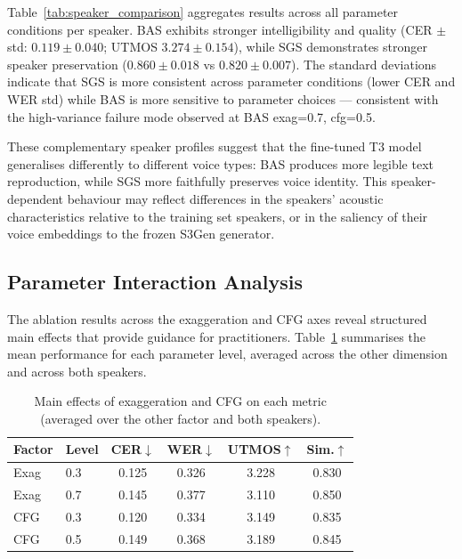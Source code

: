 \documentclass[conference]{IEEEtran}
\begin{document}
Table~\ref{tab:speaker_comparison} aggregates results across all
parameter conditions per speaker.
BAS exhibits stronger intelligibility and quality (CER $\pm$ std:
$0.119 \pm 0.040$; UTMOS $3.274 \pm 0.154$), while SGS demonstrates
stronger speaker preservation ($0.860 \pm 0.018$ vs $0.820 \pm 0.007$).
The standard deviations indicate that SGS is more consistent across
parameter conditions (lower CER and WER std) while BAS is more
sensitive to parameter choices — consistent with the high-variance
failure mode observed at BAS exag=0.7, cfg=0.5.

These complementary speaker profiles suggest that the fine-tuned T3
model generalises differently to different voice types: BAS produces
more legible text reproduction, while SGS more faithfully preserves
voice identity.
This speaker-dependent behaviour may reflect differences in the
speakers' acoustic characteristics relative to the training set
speakers, or in the saliency of their voice embeddings to the frozen
S3Gen generator.

\subsection{Parameter Interaction Analysis}

The ablation results across the exaggeration and CFG axes reveal
structured main effects that provide guidance for practitioners.
Table~\ref{tab:maineffects} summarises the mean performance for
each parameter level, averaged across the other dimension and across
both speakers.

\begin{table}[h]
\centering
\caption{Main effects of exaggeration and CFG on each metric
  (averaged over the other factor and both speakers).}
\label{tab:maineffects}
\begin{tabular}{llcccc}
\toprule
Factor & Level & CER$\downarrow$ & WER$\downarrow$ & UTMOS$\uparrow$ & Sim.$\uparrow$ \\
\midrule
Exag & 0.3 & 0.125 & 0.326 & 3.228 & 0.830 \\
Exag & 0.7 & 0.145 & 0.377 & 3.110 & 0.850 \\
\midrule
CFG  & 0.3 & 0.120 & 0.334 & 3.149 & 0.835 \\
CFG  & 0.5 & 0.149 & 0.368 & 3.189 & 0.845 \\
\bottomrule
\end{tabular}
\end{table}
\end{document}

